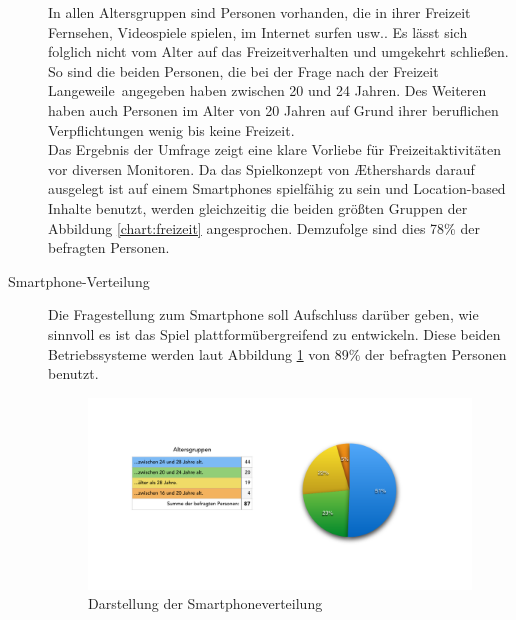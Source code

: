 \begin{description}
In allen Altersgruppen sind Personen vorhanden, die in ihrer Freizeit Fernsehen, Videospiele spielen, im Internet surfen usw.. Es lässt sich folglich nicht vom Alter auf das Freizeitverhalten und umgekehrt schließen.\\
So sind die beiden Personen, die bei der Frage nach der Freizeit \glqq Langeweile\grqq\ angegeben haben zwischen 20 und 24 Jahren. Des Weiteren haben auch Personen im Alter von 20 Jahren auf Grund ihrer beruflichen Verpflichtungen wenig bis keine Freizeit.  \\
Das Ergebnis der Umfrage zeigt eine klare Vorliebe für Freizeitaktivitäten vor diversen Monitoren. Da das Spielkonzept von Æthershards darauf ausgelegt ist auf einem Smartphones spielfähig zu sein und Location-based Inhalte benutzt, werden gleichzeitig die beiden größten Gruppen der Abbildung \ref{chart:freizeit} angesprochen. Demzufolge sind dies 78\% der befragten Personen.



\item[Smartphone-Verteilung]

Die Fragestellung zum Smartphone soll Aufschluss darüber geben, wie sinnvoll es ist das Spiel plattformübergreifend zu entwickeln. %
Diese beiden Betriebssysteme werden laut Abbildung \ref{chart:smartphoneverteilung} von 89\% der befragten Personen benutzt.

\begin{figure}[H]
    \centering
    \includegraphics[trim=40 75 30 70,clip,width=1.2\textwidth, page=3]{files/statistik/umfrage1Ergebnisse.pdf}
    \caption{Darstellung der Smartphoneverteilung}
    \label{chart:smartphoneverteilung}
\end{figure}



\end{description}
